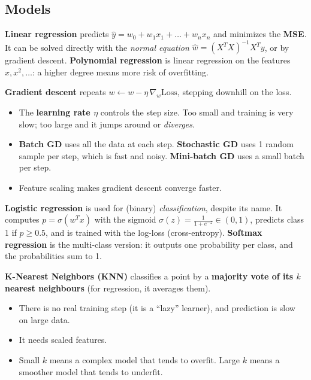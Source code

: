 \subsection{Models}
\textbf{Linear regression} predicts $\hat y = w_0 + w_1x_1 + \dots + w_nx_n$ and minimizes the \textbf{MSE}. It can be solved directly with the \emph{normal equation} $\hat w=(X^TX)^{-1}X^Ty$, or by gradient descent. \textbf{Polynomial regression} is linear regression on the features $x, x^2, \dots$: a higher degree means more risk of overfitting.

\textbf{Gradient descent} repeats $w \leftarrow w - \eta \,\nabla_w \text{Loss}$, stepping downhill on the loss.
\begin{itemize}
  \item The \textbf{learning rate $\eta$} controls the step size. Too small and training is very slow; too large and it jumps around or \emph{diverges}.
  \item \textbf{Batch GD} uses all the data at each step. \textbf{Stochastic GD} uses 1 random sample per step, which is fast and noisy. \textbf{Mini-batch GD} uses a small batch per step.
  \item Feature scaling makes gradient descent converge faster.
\end{itemize}

\textbf{Logistic regression} is used for (binary) \emph{classification}, despite its name. It computes $p=\sigma(w^Tx)$ with the sigmoid $\sigma(z)=\frac{1}{1+e^{-z}}\in(0,1)$, predicts class 1 if $p\geq 0.5$, and is trained with the log-loss (cross-entropy). \textbf{Softmax regression} is the multi-class version: it outputs one probability per class, and the probabilities sum to 1.

\textbf{K-Nearest Neighbors (KNN)} classifies a point by a \textbf{majority vote of its $k$ nearest neighbours} (for regression, it averages them).
\begin{itemize}
  \item There is no real training step (it is a ``lazy'' learner), and prediction is slow on large data.
  \item It needs scaled features.
  \item Small $k$ means a complex model that tends to overfit. Large $k$ means a smoother model that tends to underfit.
\end{itemize}

